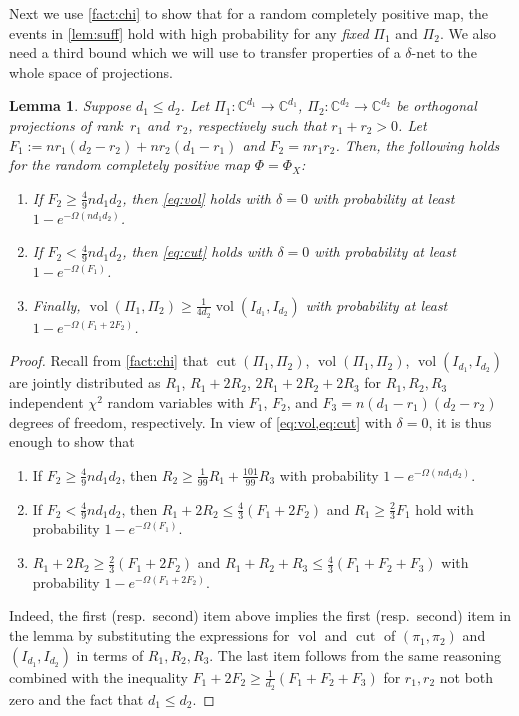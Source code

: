 \documentclass[aos]{imsart}
\newtheorem{lemma}[theorem]{Lemma}
\theoremstyle{definition}
\numberwithin{equation}{section}
\DeclareMathOperator{\vol}{vol}
\DeclareMathOperator{\cut}{cut}
\newcommand{\C}{{\mathbb{C}}}
\begin{document}
\begin{appendix}
Next we use \cref{fact:chi} to show that for a random completely positive map, the events in \cref{lem:suff} hold with high probability for any \emph{fixed} $\Pi_1$ and $\Pi_2$. We also need a third bound which we will use to transfer properties of a $\delta$-net to the whole space of projections.

\begin{lemma}\label{lem:probabilities}
Suppose $d_1 \leq d_2$. Let $\Pi_1\colon \C^{d_1} \to \C^{d_1}$, $\Pi_2\colon \C^{d_2} \to \C^{d_2}$ be orthogonal projections of rank~$r_1$ and~$r_2$, respectively such that $r_1 + r_2 > 0$.
Let $F_1:= n r_1(d_2 - r_2) + n r_2(d_1-r_1)$ and $F_2 = n r_1 r_2$.
Then, the following holds for the random completely positive map $\Phi=\Phi_X$:
\begin{enumerate}
\item If $F_2 \geq \frac49 n d_1 d_2$, then \cref{eq:vol} holds with $\delta = 0$ with probability at least $1 - e^{-\Omega( n d_1 d_2)}$.
\item If $F_2 < \frac49 n d_1 d_2$, then \cref{eq:cut} holds with $\delta = 0$ with probability at least $1 - e^{-\Omega( F_1)}$.
\item Finally, $\vol(\Pi_1, \Pi_2) \geq \frac{1}{4d_2}  \vol(I_{d_1}, I_{d_2})$ with probability at least $1 - e^{- \Omega(F_1 + 2F_2)}$.
\end{enumerate}
\end{lemma}
\begin{proof}
Recall from \cref{fact:chi} that $\cut(\Pi_1, \Pi_2)$, $\vol(\Pi_1, \Pi_2)$, $\vol(I_{d_1}, I_{d_2})$ are jointly distributed as $R_1$, $R_1 + 2R_2$, $2R_1 + 2R_2 + 2R_3$ for $R_1, R_2, R_3$ independent $\chi^2$ random variables with $F_1$, $F_2$, and $F_3 = n(d_1-r_1)(d_2-r_2)$ degrees of freedom, respectively.
In view of \cref{eq:vol,eq:cut} with $\delta=0$, it is thus enough to show that
\begin{enumerate}
\item If $F_2 \geq \frac49 n d_1 d_2$, then $R_2 \geq \frac1{99} R_1 + \frac{101}{99} R_3$ with probability $1 - e^{-\Omega( n d_1 d_2)}$.
\item If $F_2 < \frac49 n d_1 d_2$, then $R_1 + 2R_2 \leq \frac43 (F_1 + 2F_2)$ and $R_1 \geq \frac23 F_1$ hold with probability $1 - e^{-\Omega(F_1)}$.
\item $R_1 + 2 R_2 \geq \frac23 (F_1 + 2F_2)$ and $R_1 + R_2 + R_3 \leq \frac43 (F_1 + F_2 + F_3)$ with probability $1 - e^{- \Omega(F_1 + 2F_2)}$.
\end{enumerate}
Indeed, the first (resp.\ second) item above implies the first (resp.\ second) item in the lemma by substituting the expressions for $\vol$ and $\cut $ of $(\pi_1, \pi_2)$ and $(I_{d_1}, I_{d_2})$ in terms of $R_1, R_2, R_3$. The last item follows from the same reasoning combined with the inequality $F_1 + 2 F_2 \geq \frac{1}{d_2} (F_1 + F_2 + F_3)$ for $r_1, r_2$ not both zero and the fact that $d_1 \leq d_2$.


\end{proof}
\end{appendix}
\end{document}
